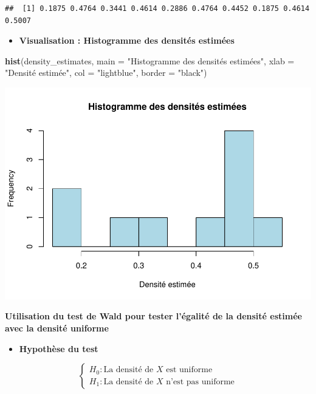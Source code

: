 \documentclass[
  12pt,
]{article}
\newenvironment{Shaded}{\begin{snugshade}}{\end{snugshade}}
\newcommand{\AttributeTok}[1]{\textcolor[rgb]{0.13,0.29,0.53}{#1}}
\newcommand{\FunctionTok}[1]{\textcolor[rgb]{0.13,0.29,0.53}{\textbf{#1}}}
\newcommand{\NormalTok}[1]{#1}
\newcommand{\StringTok}[1]{\textcolor[rgb]{0.31,0.60,0.02}{#1}}
\providecommand{\tightlist}{%
  \setlength{\itemsep}{0pt}\setlength{\parskip}{0pt}}
\begin{document}
\begin{verbatim}
##  [1] 0.1875 0.4764 0.3441 0.4614 0.2886 0.4764 0.4452 0.1875 0.4614 0.5007
\end{verbatim}

\begin{itemize}
\tightlist
\item
  \textbf{Visualisation : Histogramme des densités estimées}
\end{itemize}

\begin{Shaded}
\begin{Highlighting}[]
\FunctionTok{hist}\NormalTok{(density\_estimates,}
     \AttributeTok{main =} \StringTok{"Histogramme des densités estimées"}\NormalTok{,}
     \AttributeTok{xlab =} \StringTok{"Densité estimée"}\NormalTok{,}
     \AttributeTok{col =} \StringTok{"lightblue"}\NormalTok{,}
     \AttributeTok{border =} \StringTok{"black"}\NormalTok{)}
\end{Highlighting}
\end{Shaded}

\includegraphics{Stat_non_para_files/figure-latex/unnamed-chunk-188-1.pdf}

\textbf{Utilisation du test de Wald pour tester l'égalité de la densité
estimée avec la densité uniforme}

\begin{itemize}
\tightlist
\item
  \textbf{Hypothèse du test}
\end{itemize}

\[
\begin{cases}
H_0 : \text{La densité de } X \text{ est uniforme} \\
H_1 : \text{La densité de } X \text{ n'est pas uniforme}
\end{cases}
\]
\end{document}
